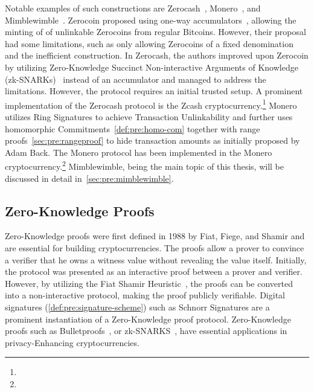 
Notable examples of such constructions are Zerocash~\cite{sasson2014zerocash}, Monero~\cite{noether2015ring}, and Mimblewimble~\cite{jedusor2016mimblewimble}.
Zerocoin proposed using one-way accumulators~\cite{benaloh1993one}, allowing the minting of of unlinkable Zerocoins from regular Bitcoins.
However, their proposal had some limitations, such as only allowing Zerocoins of a fixed denomination and the inefficient construction.
In Zerocash, the authors improved upon Zerocoin by utilizing Zero-Knowledge Succinct Non-interactive Arguments of Knowledge (zk-SNARKs)~\cite{bitansky2012extractable} instead of an accumulator and managed to address the limitations.
However, the protocol requires an initial trusted setup.
A prominent implementation of the Zerocash protocol is the Zcash cryptocurrency.\footnote{\urlzcash}
Monero utilizes Ring Signatures to achieve Transaction Unlinkability and further uses homomorphic Commitments~\cref{def:pre:homo-com} together with range proofs~\cref{sec:pre:rangeproof}  to hide transaction amounts as initially proposed by Adam Back.
The Monero protocol has been implemented in the Monero cryptocurrency.\footnote{\urlmonero}
Mimblewimble, being the main topic of this thesis, will be discussed in detail in~\cref{sec:pre:mimblewimble}.

\subsection{Zero-Knowledge Proofs} \label{sec:pre:privacy:zeroknowlegde}

Zero-Knowledge proofs were first defined in 1988 by Fiat, Fiege, and Shamir and are essential for building cryptocurrencies.
The proofs allow a prover to convince a verifier that he owns a witness value without revealing the value itself.
Initially, the protocol was presented as an interactive proof between a prover and verifier.
However, by utilizing the Fiat Shamir Heuristic~\cite{feige1988zero}, the proofs can be converted into a non-interactive protocol, making the proof publicly verifiable.
Digital signatures (\cref{def:pre:signature-scheme}) such as Schnorr Signatures are a prominent instantiation of a Zero-Knowledge proof protocol.
Zero-Knowledge proofs such as Bulletproofs~\cite{bunz2018bulletproofs}, or zk-SNARKS~\cite{bitansky2012extractable}, have essential applications in privacy-Enhancing cryptocurrencies.

